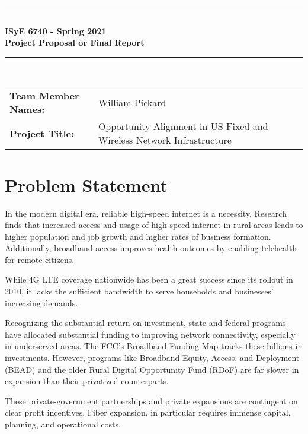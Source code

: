\documentclass{article}
\begin{document}
\setlength{\hsize}{0.9\hsize}%
\begin{titlepage}
	\clearpage\thispagestyle{empty}
	\centering
	\vspace{1cm}
	
	\rule{\linewidth}{1mm} \\[0.5cm]
	{ \Large \bfseries ISyE 6740 - Spring 2021\\[0.2cm]
	Project Proposal or Final Report}\\[0.5cm]
	\rule{\linewidth}{1mm} \\[1cm]
	
	\begin{tabular}{l p{5cm}}
		\textbf{Team Member Names:} & William Pickard  \\[10pt]
		\textbf{Project Title:} & Opportunity Alignment in US Fixed and Wireless Network Infrastructure \\[10pt]
	\end{tabular} 
\pagebreak

\end{titlepage}

\flushleft
\setlength{\parindent}{20pt}
\section{Problem Statement}

In the modern digital era, reliable high-speed internet is a necessity. Research finds that increased access and usage of high-speed internet in rural areas leads to higher population and job growth and higher rates of business formation. Additionally, broadband access improves health outcomes by enabling telehealth for remote citizens\supercite{Campbell_Castro_Wessel_2021}.

While 4G LTE coverage nationwide has been a great success since its rollout in 2010, it lacks the sufficient bandwidth to serve households and businesses' increasing demands. 

Recognizing the substantial return on investment, state and federal programs have allocated substantial funding to improving network connectivity, especially in underserved areas. The FCC's Broadband Funding Map tracks these billions in investments. However, programs like Broadband Equity, Access, and Deployment (BEAD) and the older Rural Digital Opportunity Fund (RDoF) are far slower in expansion than their privatized counterparts.

These private-government partnerships and private expansions are contingent on clear profit incentives. Fiber expansion, in particular requires immense capital, planning, and operational costs. 
\end{document}

